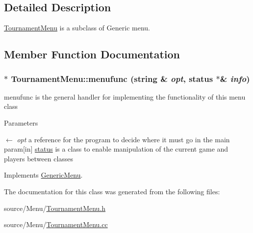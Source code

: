 \subsection{Detailed Description}
\hyperlink{classTournamentMenu}{TournamentMenu} is a subclass of Generic menu. 

\subsection{Member Function Documentation}
\hypertarget{classTournamentMenu_a86ce030ba6728404ddc49aaacb45dd34}{
\subsubsection[{menufunc}]{ $\ast$ TournamentMenu::menufunc (string \& {\em opt}, \/  {\bf status} $\ast$\& {\em info})}}
\label{classTournamentMenu_a86ce030ba6728404ddc49aaacb45dd34}


menufunc is the general handler for implementing the functionality of this menu class 
\begin{DoxyParams}{Parameters}
\item[\mbox{$\leftarrow$} {\em opt}]a reference for the program to decide where it must go in the main param\mbox{[}in\mbox{]} \hyperlink{classstatus}{status} is a class to enable manipulation of the current game and players between classes \end{DoxyParams}


Implements \hyperlink{classGenericMenu_a290ad7ec3331edc968190b1d7b48a397}{GenericMenu}.

The documentation for this class was generated from the following files:\begin{DoxyCompactItemize}
\item 
source/Menu/\hyperlink{TournamentMenu_8h}{TournamentMenu.h}\item 
source/Menu/\hyperlink{TournamentMenu_8cc}{TournamentMenu.cc}\end{DoxyCompactItemize}
